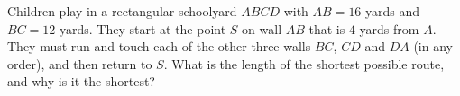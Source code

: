 Children play in a rectangular schoolyard $ABCD$ with $AB=16$ yards and $BC=12$ yards. They start at the point $S$ on wall $AB$ that is $4$ yards from $A$. They must run and touch each of the other three walls $BC$, $CD$ and $DA$ (in any order), and then return to $S$. What is the length of the shortest possible route, and why is it the shortest?
